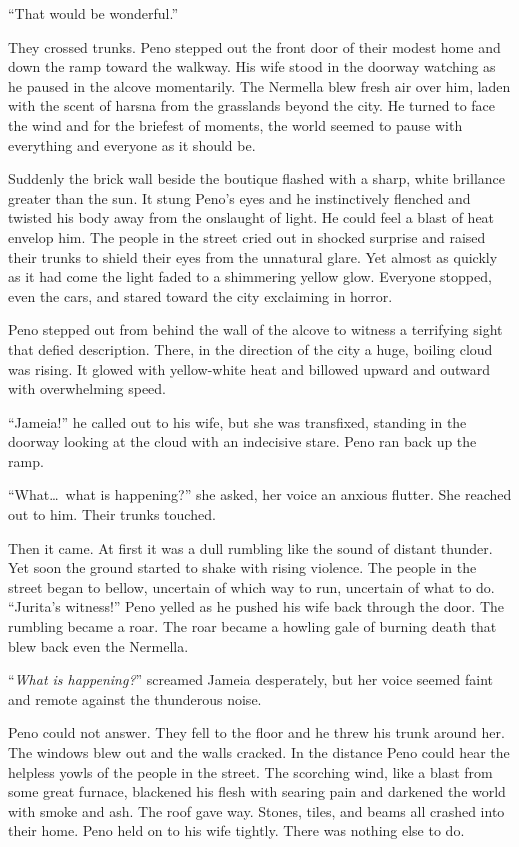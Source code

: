 ``That would be wonderful.''

They crossed trunks. Peno stepped out the front door of their modest home and down the ramp
toward the walkway. His wife stood in the doorway watching as he paused in the alcove
momentarily. The Nermella blew fresh air over him, laden with the scent of harsna from the
grasslands beyond the city. He turned to face the wind and for the briefest of moments, the
world seemed to pause with everything and everyone as it should be.

Suddenly the brick wall beside the boutique flashed with a sharp, white brillance greater than
the sun. It stung Peno's eyes and he instinctively flenched and twisted his body away from the
onslaught of light. He could feel a blast of heat envelop him. The people in the street cried
out in shocked surprise and raised their trunks to shield their eyes from the unnatural glare.
Yet almost as quickly as it had come the light faded to a shimmering yellow glow. Everyone
stopped, even the cars, and stared toward the city exclaiming in horror.

Peno stepped out from behind the wall of the alcove to witness a terrifying sight that defied
description. There, in the direction of the city a huge, boiling cloud was rising. It glowed
with yellow-white heat and billowed upward and outward with overwhelming speed.

``Jameia!'' he called out to his wife, but she was transfixed, standing in the doorway looking
at the cloud with an indecisive stare. Peno ran back up the ramp.

``What\ldots\ what is happening?'' she asked, her voice an anxious flutter. She reached out to
him. Their trunks touched.

Then it came. At first it was a dull rumbling like the sound of distant thunder. Yet soon the
ground started to shake with rising violence. The people in the street began to bellow,
uncertain of which way to run, uncertain of what to do. ``Jurita's witness!'' Peno yelled
as he pushed his wife back through the door. The rumbling became a roar. The roar became a
howling gale of burning death that blew back even the Nermella.

``\emph{What is happening?}'' screamed Jameia desperately, but her voice seemed faint and remote
against the thunderous noise.

Peno could not answer. They fell to the floor and he threw his trunk around her. The windows
blew out and the walls cracked. In the distance Peno could hear the helpless yowls of the people
in the street. The scorching wind, like a blast from some great furnace, blackened his flesh
with searing pain and darkened the world with smoke and ash. The roof gave way. Stones, tiles,
and beams all crashed into their home. Peno held on to his wife tightly. There was nothing else
to do.

